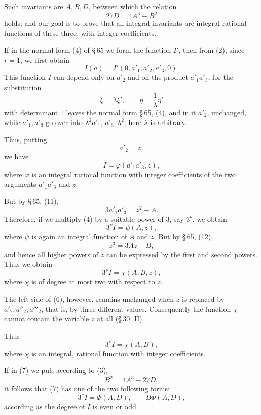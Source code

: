 \documentclass[11pt]{article}
\begin{document}
Such invariants are $A,B,D$, between which the relation
\begin{equation}
 27D=4A^3-B^2
\tag{3}
\end{equation}
holds; and our goal is to prove that all integral invariants are integral rational functions of these three, with integer coefficients.

If in the normal form (4) of \S\,65 we form the function $I'$, then from (2), since $r=1$, we first obtain
\[
 I(a)=I'(0,a'_1,a'_2,a'_3,0).
\]
This function $I$ can depend only on $a'_2$ and on the product $a'_1a'_3$, for the substitution
\[
 \xi=\lambda\xi',
 \qquad
 \eta=\frac1\lambda\eta'
\]
with determinant $1$ leaves the normal form \S\,65, (4), and in it $a'_2$, unchanged, while $a'_1,a'_3$ go over into $\lambda^2a'_1$, $a'_3:\lambda^2$; here $\lambda$ is arbitrary.

Thus, putting
\[
 a'_2=z,
\]
we have
\begin{equation}
 I=\varphi(a'_1a'_3,z),
\tag{4}
\end{equation}
where $\varphi$ is an integral rational function with integer coefficients of the two arguments $a'_1a'_3$ and $z$.

But by \S\,65, (11),
\[
 3a'_1a'_3=z^2-A.
\]
Therefore, if we multiply (4) by a suitable power of $3$, say $3^\nu$, we obtain
\begin{equation}
 3^\nu I=\psi(A,z),
\tag{5}
\end{equation}
where $\psi$ is again an integral function of $A$ and $z$. But by \S\,65, (12),
\[
 z^3=3Az-B,
\]
and hence all higher powers of $z$ can be expressed by the first and second powers. Thus we obtain
\begin{equation}
 3^\nu I=\chi(A,B,z),
\tag{6}
\end{equation}
where $\chi$ is of degree at most two with respect to $z$.

The left side of (6), however, remains unchanged when $z$ is replaced by $a'_2,a''_2,a'''_2$, that is, by three different values. Consequently the function $\chi$ cannot contain the variable $z$ at all (\S\,30, II).

Thus
\begin{equation}
 3^\nu I=\chi(A,B),
\tag{7}
\end{equation}
where $\chi$ is an integral, rational function with integer coefficients.

If in (7) we put, according to (3),
\[
 B^2=4A^3-27D,
\]
it follows that (7) has one of the two following forms:
\begin{equation}
 3^\nu I=\Phi(A,D),
 \qquad
 B\Phi(A,D),
\tag{8}
\end{equation}
according as the degree of $I$ is even or odd.
\end{document}
